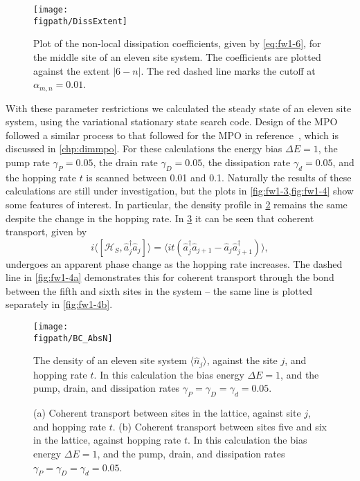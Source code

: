 \begin{figure}[ht!]
	\centering
	\texttt{[image: \\figpath/DissExtent]}
	\caption{\label{fig:fw1-2}Plot of the non-local dissipation coefficients, given by \cref{eq:fw1-6}, for the middle site of an eleven site system. The coefficients are plotted against the extent \(|6-n|\). The red dashed line marks the cutoff at \(\alpha_{m,n} = 0.01\).}
\end{figure}

With these parameter restrictions we calculated the steady state of an eleven site system, using the variational stationary state search code. Design of the MPO followed a similar process to that followed for the MPO in reference~\cite{Owen2017}, which is discussed in \cref{chp:dimmpo}. For these calculations the energy bias \(\Delta E = 1\), the pump rate \(\gamma_{P} = 0.05\), the drain rate \(\gamma_{D} = 0.05\), the dissipation rate \(\gamma_{d} = 0.05\), and the hopping rate \(t\) is scanned between 0.01 and 0.1. Naturally the results of these calculations are still under investigation, but the plots in \cref{fig:fw1-3,fig:fw1-4} show some features of interest. In particular, the density profile in \cref{fig:fw1-3} remains the same despite the change in the hopping rate. In \cref{fig:fw1-4} it can be seen that coherent transport, given by
\begin{equation}
	i\langle [\mathcal{H}_{S}, \hat{a}_{j}^{\dagger}\hat{a}_{j}] \rangle =  \langle it \left(\hat{a}_{j}^{\dagger}\hat{a}_{j+1} - \hat{a}_{j}\hat{a}_{j+1}^{\dagger}\right) \rangle,
	\label{eq:fw1-8}
\end{equation}
undergoes an apparent phase change as the hopping rate increases. The dashed line in \cref{fig:fw1-4a} demonstrates this for coherent transport through the bond between the fifth and sixth sites in the system -- the same line is plotted separately in \cref{fig:fw1-4b}.

\begin{figure}[ht!]
	\centering
	\texttt{[image: \\figpath/BC\_AbsN]}
	\caption{\label{fig:fw1-3}The density of an eleven site system \(\langle \hat{n}_{j} \rangle\), against the site \(j\), and hopping rate \(t\). In this calculation the bias energy \(\Delta E = 1\), and the pump, drain, and dissipation rates \(\gamma_{P} = \gamma_{D} = \gamma_{d} = 0.05\).}
\end{figure}

\begin{figure}[ht!]
	 \hfill
	\caption{\label{fig:fw1-4}(a) Coherent transport between sites in the lattice, against site \(j\), and hopping rate \(t\). (b) Coherent transport between sites five and six in the lattice, against hopping rate \(t\). In this calculation the bias energy \(\Delta E = 1\), and the pump, drain, and dissipation rates \(\gamma_{P} = \gamma_{D} = \gamma_{d} = 0.05\).}
\end{figure}

